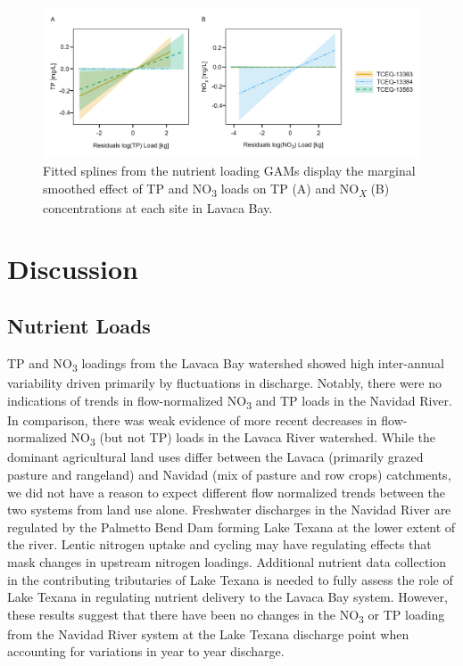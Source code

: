 \documentclass[fleqn,10pt,lineno]{wlpeerj} %
\begin{document}
\begin{figure}

{\centering \includegraphics[width=1\linewidth,]{Schramm-2023-06-PeerJ_files/figure-latex/fig7-1} 

}

\caption{Fitted splines from the nutrient loading GAMs display the marginal smoothed effect of TP and NO\textsubscript{3} loads on TP (A) and NO\textsubscript{\textit{X}} (B) concentrations at each site in Lavaca Bay.}\label{fig:fig7}
\end{figure}

\hypertarget{discussion}{%
\section*{Discussion}\label{discussion}}

\hypertarget{nutrient-loads}{%
\subsection*{Nutrient Loads}\label{nutrient-loads}}

TP and NO\textsubscript{3} loadings from the Lavaca Bay watershed showed
high inter-annual variability driven primarily by fluctuations in
discharge. Notably, there were no indications of trends in
flow-normalized NO\textsubscript{3} and TP loads in the Navidad River.
In comparison, there was weak evidence of more recent decreases in
flow-normalized NO\textsubscript{3} (but not TP) loads in the Lavaca
River watershed. While the dominant agricultural land uses differ
between the Lavaca (primarily grazed pasture and rangeland) and Navidad
(mix of pasture and row crops) catchments, we did not have a reason to
expect different flow normalized trends between the two systems from
land use alone. Freshwater discharges in the Navidad River are regulated
by the Palmetto Bend Dam forming Lake Texana at the lower extent of the
river. Lentic nitrogen uptake and cycling may have regulating effects
that mask changes in upstream nitrogen loadings. Additional nutrient
data collection in the contributing tributaries of Lake Texana is needed
to fully assess the role of Lake Texana in regulating nutrient delivery
to the Lavaca Bay system. However, these results suggest that there have
been no changes in the NO\textsubscript{3} or TP loading from the
Navidad River system at the Lake Texana discharge point when accounting
for variations in year to year discharge.
\end{document}
